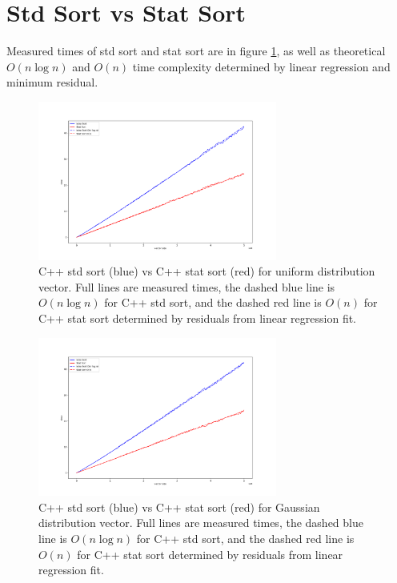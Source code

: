 \documentclass[12pt]{article}
\begin{document}
	\section{Std Sort vs Stat Sort}
	
		Measured times of std sort and stat sort are in figure \ref{fig1}, as well as theoretical $O(n \log n)$ and $O(n)$ time complexity determined by linear regression and minimum residual.

		\begin{figure}
		\begin{center}
			\includegraphics[width=0.7\textwidth]{fig_perf_norm}
		\end{center}
			\caption{C++ std sort (blue) vs C++ stat sort (red) for uniform distribution vector. Full lines are measured times, the dashed blue line is $O(n \log n)$ for C++ std sort, and the dashed red line is $O(n)$ for C++ stat sort determined by residuals from linear regression fit.}
		
		\label{fig1}
		\end{figure}		

		\begin{figure}
		\begin{center}
			\includegraphics[width=0.7\textwidth]{fig_perf_gauss}
		\end{center}
			\caption{C++ std sort (blue) vs C++ stat sort (red) for Gaussian distribution vector. Full lines are measured times, the dashed blue line is $O(n \log n)$ for C++ std sort, and the dashed red line is $O(n)$ for C++ stat sort determined by residuals from linear regression fit.}
		
		\label{fig2}
		\end{figure}		
\end{document}
